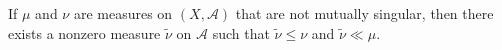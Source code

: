 If $\mu$ and $\nu$ are measures on $(X, \mathcal{A})$ that are not mutually singular, then there exists a nonzero measure $\tilde{\nu}$ on $\mathcal{A}$ such that $\tilde{\nu} \leq \nu$ and $\tilde{\nu} \ll \mu$.
